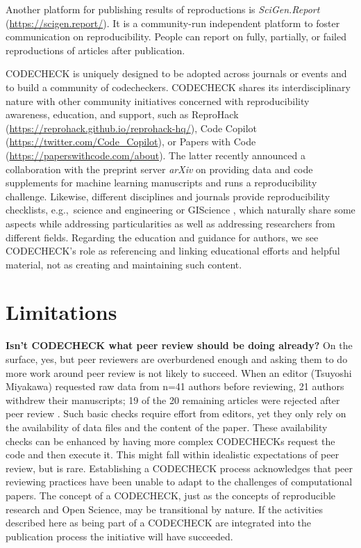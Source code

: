 \documentclass[12pt]{article}
\begin{document}
Another platform for publishing results of reproductions is
\emph{SciGen.Report} (\url{https://scigen.report/}).  It is a
community-run independent platform to foster communication on
reproducibility.  People can report on fully, partially, or
failed reproductions of articles after publication.

CODECHECK is uniquely designed to be adopted across journals or events
and to build a community of codecheckers. CODECHECK shares its
interdisciplinary nature with other community initiatives concerned
with reproducibility awareness, education, and support, such as
ReproHack (\url{https://reprohack.github.io/reprohack-hq/}),
Code Copilot (\url{https://twitter.com/Code_Copilot}), or
Papers with Code (\url{https://paperswithcode.com/about}).
The latter recently announced a collaboration with the preprint server
\emph{arXiv} on providing data and code supplements for machine
learning manuscripts
and runs a reproducibility challenge.
Likewise, different disciplines and journals provide reproducibility
checklists, e.g.,~science and engineering \cite{rosenberg_next_2020} or
GIScience \cite{nust_agile_2019}, which naturally share some aspects
while addressing particularities as well as addressing researchers
from different fields. Regarding the education and guidance for
authors, we see CODECHECK's role as referencing and linking
educational efforts and helpful material, not as creating and
maintaining such content.

\section*{Limitations}\label{limitations}

\textbf{Isn't CODECHECK what peer review should be doing already?}  On
the surface, yes, but peer reviewers are overburdened enough and
asking them to do more work around peer review is not likely to
succeed.  When an editor (Tsuyoshi Miyakawa) requested raw data from
n=41 authors before reviewing, 21 authors withdrew their manuscripts;
19 of the 20 remaining articles were rejected after peer review
\cite{miyakawa_no_2020}.  Such basic checks require effort from
editors, yet they only rely on the availability of data files and the
content of the paper.  These availability checks can be enhanced by
having more complex CODECHECKs request the code and then execute it.
This might fall within idealistic expectations of peer review, but is
rare.  Establishing a CODECHECK process acknowledges that peer
reviewing practices have been unable to adapt to the challenges of
computational papers.  The concept of a CODECHECK, just as the
concepts of reproducible research and Open Science, may be
transitional by nature. If the activities described here as being part
of a CODECHECK are integrated into the publication process the
initiative will have succeeded.
\end{document}
